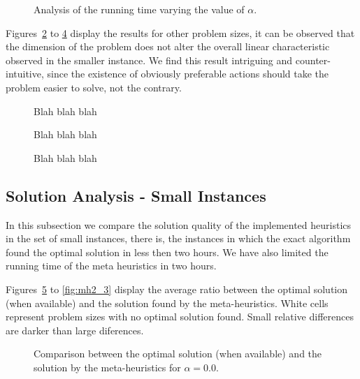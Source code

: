 \begin{figure}
\centering
\missingfigure[figwidth=8cm]{}
\caption{Analysis of the running time varying the value of $\alpha$.}
\label{fig:alpha_5_5}
\end{figure}

Figures~\ref{fig:alpha_10_5} to \ref{fig:alpha_10_10} display the results for other problem sizes,
it can be observed that the dimension of the problem does not alter the overall linear characteristic observed in
the smaller instance. We find this result intriguing and counter-intuitive, since the existence of obviously
preferable actions should take the problem easier to solve, not the contrary.

\begin{figure}
\centering
\missingfigure[figwidth=8cm]{}
\caption{Blah blah blah}
\label{fig:alpha_10_5}
\end{figure}

\begin{figure}
\centering
\missingfigure[figwidth=8cm]{}
\caption{Blah blah blah}
\label{fig:alpha_5_10}
\end{figure}

\begin{figure}
\centering
\missingfigure[figwidth=8cm]{}
\caption{Blah blah blah}
\label{fig:alpha_10_10}
\end{figure}

\subsection{Solution Analysis - Small Instances}

In this subsection we compare the solution quality of the implemented heuristics
in the set of small instances, there is, the instances in which the exact algorithm
found the optimal solution in less then two hours. We have also limited the running time
of the meta heuristics in two hours.

Figures~\ref{fig:mh1_1} to \ref{fig:mh2_3} display the average ratio between the optimal solution (when available) 
and the solution found by the meta-heuristics. White cells represent problem sizes with no
optimal solution found. Small relative differences are darker than large diferences.

\begin{figure}
\centering
\caption{Comparison between the optimal solution (when available) 
and the solution by the meta-heuristics for $\alpha=0.0$.}
\label{fig:mh1_1}
\end{figure}

